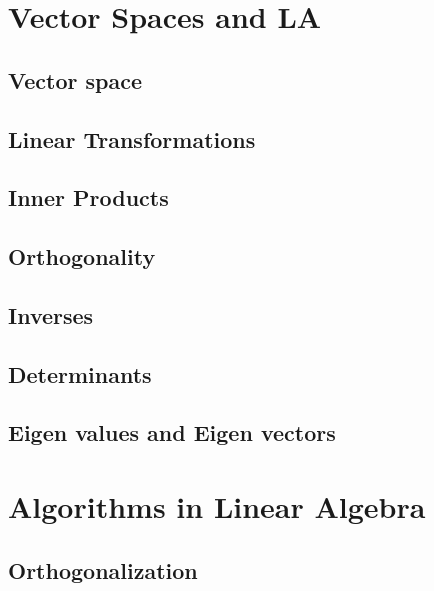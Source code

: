 \part{Vector Spaces and LA}
\newpage
\chapter{Vector space} \label{ch:vec_space}

\newpage

\newpage
\chapter{Linear Transformations}


\chapter{Inner Products}


\chapter{Orthogonality}

\newpage
\chapter{Inverses}


\chapter{Determinants}


\chapter{Eigen values and Eigen vectors}






\part{Algorithms in Linear Algebra}

\chapter{Orthogonalization}


